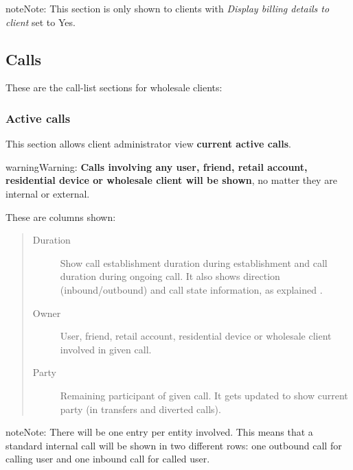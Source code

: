 \documentclass[letterpaper,10pt,english]{sphinxmanual}
\begin{document}
\begin{notice}{note}{Note:}
This section is only shown to clients with \emph{Display billing details to client} set to Yes.
\end{notice}


\subsection{Calls}
\label{administration_portal/client/wholesale/calls/index::doc}\label{administration_portal/client/wholesale/calls/index:calls}
These are the call-list sections for wholesale clients:


\subsubsection{Active calls}
\label{administration_portal/client/wholesale/calls/active_calls::doc}\label{administration_portal/client/wholesale/calls/active_calls:active-calls}
This section allows client administrator view \textbf{current active calls}.

\begin{notice}{warning}{Warning:}
\textbf{Calls involving any user, friend, retail account, residential device or wholesale client will be shown},
no matter they are internal or external.
\end{notice}

These are columns shown:
\begin{quote}
\begin{description}
\item[{Duration}] \leavevmode
Show call establishment duration during establishment and call duration during ongoing call. It also shows
direction (inbound/outbound) and call state information, as explained {\hyperref[administration_portal/platform/active_calls:call\string-state]{}}.

\item[{Owner}] \leavevmode
User, friend, retail account, residential device or wholesale client involved in given call.

\item[{Party}] \leavevmode
Remaining participant of given call. It gets updated to show current party (in transfers and diverted calls).

\end{description}
\end{quote}

\begin{notice}{note}{Note:}
There will be one entry per entity involved. This means that a standard internal call will be shown
in two different rows: one outbound call for calling user and one inbound call for called user.
\end{notice}
\end{document}
